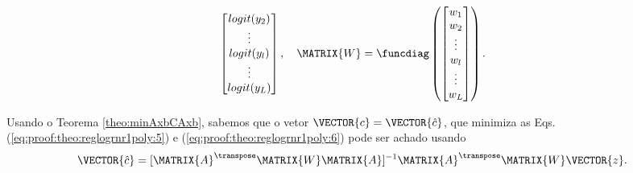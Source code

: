 \begin{myproofT}
\begin{equation}
\begin{bmatrix}
logit(y_2)  \\
\vdots  \\
logit(y_l)  \\
\vdots \\
logit(y_L) \\
\end{bmatrix},
\quad
\MATRIX{W}=
\funcdiag \left(
\begin{bmatrix}
w_1  \\
w_2  \\
\vdots  \\
w_l  \\
\vdots \\
w_L \\
\end{bmatrix} \right).
\end{equation}


Usando o Teorema \ref{theo:minAxbCAxb}, sabemos que o vetor $\VECTOR{c}=\VECTOR{\hat{c}}$,
que minimiza as Eqs. (\ref{eq:proof:theo:reglogrnr1poly:5}) e (\ref{eq:proof:theo:reglogrnr1poly:6}) pode ser achado usando 
\begin{equation}\label{eq:proof:theo:reglogrnr1poly:8}
\VECTOR{\hat{c}}=[\MATRIX{A}^{\transpose}\MATRIX{W}\MATRIX{A}]^{-1}\MATRIX{A}^{\transpose}\MATRIX{W}\VECTOR{z}.
\end{equation}
\end{myproofT}

